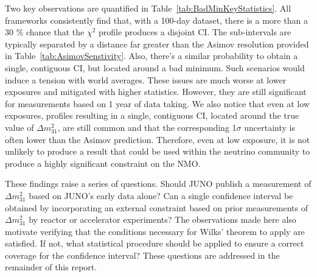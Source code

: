 Two key observations are quantified in Table~\ref{tab:BadMinKeyStatistics}. All frameworks consistently find that, with a 100-day dataset,  there is a more than a 30 $\%$ chance that the $\chi^2$ profile produces a disjoint CI. The sub-intervals are typically separated by a distance far greater than the Asimov resolution provided in Table~\ref{tab:AsimovSenstivity}. Also, there's a similar probability to obtain a single, contiguous CI, but located around a bad minimum. Such scenarios would induce a tension with world averages. 
These issues are much worse at lower exposures and mitigated with higher statistics. However, they are still significant for
measurements based on 1 year of data taking. We also notice that even at low exposures, profiles resulting in a single, contiguous CI, located around the true value of $\Delta m^2_{31}$,  are still common and that the corresponding 1$\sigma$ uncertainty is often lower than the Asimov prediction. Therefore, even at low exposure, it is not unlikely to produce a result that could be used within  the neutrino community to produce a highly significant constraint on the NMO. 

These findings raise a series of questions. Should JUNO publish a measurement of $\Delta m^2_{31}$ based on JUNO's early data alone? Can a single confidence interval be obtained by incorporating an external constraint based on prior measurements of $\Delta m^2_{31}$ by reactor or accelerator experiments? The	observations made here also motivate verifying that the conditions necessary for Wilks' theorem to apply 
are satisfied. If not, what statistical procedure should be applied to ensure a correct coverage for the confidence interval? These questions are addressed in the remainder of this report. 
    
